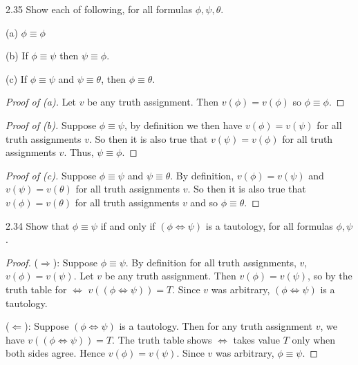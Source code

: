 \documentclass{article}
\theoremstyle{remark}\newtheorem{remark}{Remark}
\theoremstyle{plain}
\begin{document}
2.35 Show each of following, for all formulas $\phi, \psi, \theta$.

(a) $\phi \equiv \phi$

(b) If $\phi \equiv \psi$ then $\psi \equiv \phi$.

(c) If $\phi \equiv \psi$ and $\psi \equiv \theta$, then $\phi \equiv \theta$.

\begin{proof}[Proof of (a)]
    Let $v$ be any truth assignment. Then $v(\phi) = v(\phi)$ so $\phi \equiv \phi$.
\end{proof}

\begin{proof}[Proof of (b)]
    Suppose $\phi \equiv \psi$, by definition we then have $v(\phi) = v(\psi)$ for all truth assignments $v$. So then it is also true that $v(\psi) = v(\phi)$ for all truth assignments $v$. Thus, $\psi \equiv \phi$.
\end{proof}

\begin{proof}[Proof of (c)]
    Suppose $\phi \equiv \psi$ and $\psi \equiv \theta$. By definition, $v(\phi) = v(\psi)$ and $v(\psi) = v(\theta)$ for all truth assignments $v$. So then it is also true that $v(\phi) = v(\theta)$ for all truth assignments $v$ and so $\phi \equiv \theta$.
\end{proof}

2.34 Show that $\phi \equiv \psi$ if and only if $(\phi \iff \psi)$ is a tautology, for all formulas $\phi, \psi$.

\begin{proof}
    ($\Rightarrow$):
    Suppose $\phi \equiv \psi$. By definition for all truth assignments, $v$, $v(\phi) = v(\psi)$. Let $v$ be any truth assignment. Then $v(\phi) = v(\psi)$, so by the truth table for $\iff$ $v((\phi \iff \psi)) = T$. Since $v$ was arbitrary, $(\phi \iff \psi)$ is a tautology.

    ($\Leftarrow$):
    Suppose $(\phi \iff \psi)$ is a tautology. Then for any truth assignment $v$, we have $v((\phi \iff \psi)) = T$. The truth table shows $\iff$ takes value $T$ only when both sides agree. Hence $v(\phi) = v(\psi)$. Since $v$ was arbitrary, $\phi \equiv \psi$.
\end{proof}
\end{document}
